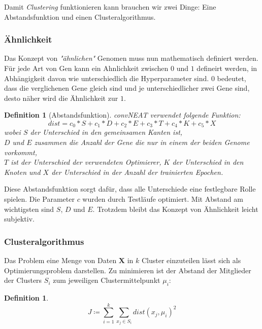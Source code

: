 \documentclass[]{scrartcl}
\newtheorem{defi}[satz]{Definition}
\begin{document}
			Damit \textit{Clustering} funktionieren kann brauchen wir zwei Dinge: Eine Abstandsfunktion und einen Clusteralgorithmus.

			\subsubsection{Ähnlichkeit}

				Das Konzept von \textit{"ähnlichen"} Genomen muss nun mathematisch definiert werden.
				Für jede Art von Gen kann ein Ahnlichkeit zwischen $0$ und $1$ defineirt werden, in Abhängigkeit davon wie unterschiedlich
				die Hyperparameter sind. $0$ bedeutet, dass die verglichenen Gene gleich sind
				und je unterschiedlicher zwei Gene sind, desto näher wird die Ähnlichkeit zur $1$.

				\begin{defi} [Abstandsfunktion]
					\textit{convNEAT} verwendet folgende Funktion: \\
					$$dist = c_0*S + c_1*D + c_2*E + c_3*T + c_4*K + c_5*X$$
					wobei $S$ der Unterschied in den gemeinsamen Kanten ist, \\
					$D$ und $E$ zusammen die Anzahl der Gene die nur in einem der beiden Genome vorkommt, \\
					$T$ ist der Unterschied der verwendeten Optimierer, $K$ der Unterschied in den Knoten und $X$ der Unterschied in der Anzahl der trainierten Epochen.
				\end{defi}
				
				Diese Abstandsfunktion sorgt dafür, dass alle Unterschiede eine festlegbare Rolle spielen.
				Die Parameter $c$ wurden durch Testläufe optimiert. Mit Abstand am wichtigsten sind $S$, $D$ und $E$.
				Trotzdem bleibt das Konzept von Ähnlichkeit leicht subjektiv.

			\subsubsection{Clusteralgorithmus}
				
				Das Problem eine Menge von Daten $\mathbf{X}$ in $k$ Cluster einzuteilen lässt sich als Optimierungsproblem darstellen. Zu minimieren ist der
				Abstand der Mitglieder der Clusters $S_i$ zum jeweiligen Clustermittelpunkt $\mu_i$:

				\begin{defi}
					$$J \coloneqq \sum _{i=1}^{k}\sum _{x_j \in S_i} dist(x_j, \mu_i)^2$$
				\end{defi}
\end{document}
